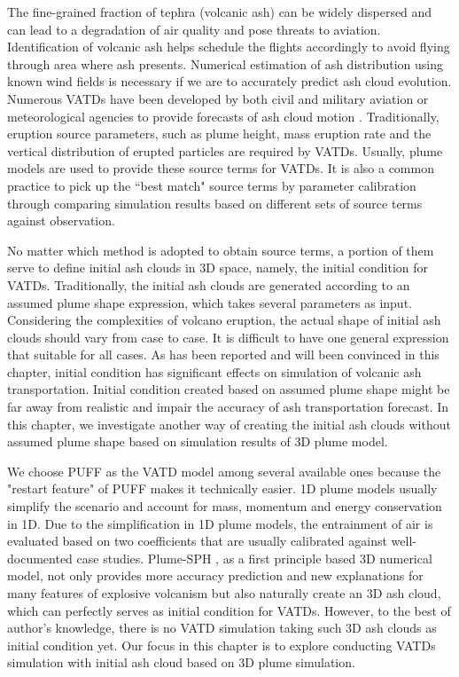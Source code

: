 The fine-grained fraction of tephra (volcanic ash) can be widely dispersed and can lead to a degradation of air quality and pose threats to aviation. Identification of volcanic ash helps schedule the flights accordingly to avoid flying through area where ash presents. Numerical estimation of ash distribution using known wind fields is necessary if we are to accurately predict ash cloud evolution. Numerous VATDs have been developed by both civil and military aviation or meteorological agencies to provide forecasts of ash cloud motion \citep{witham2007comparison}. Traditionally, eruption source parameters, such as plume height, mass eruption rate and the vertical distribution of erupted particles are required by VATDs. Usually, plume models are used to provide these source terms for VATDs. It is also a common practice to pick up the ``best match" source terms by parameter calibration through comparing simulation results based on different sets of source terms against observation. 

No matter which method is adopted to obtain source terms, a portion of them serve to define initial ash clouds in 3D space, namely, the initial condition for VATDs. Traditionally, the initial ash clouds are generated according to an assumed plume shape expression, which takes several parameters as input. Considering the complexities of volcano eruption, the actual shape of initial ash clouds should vary from case to case. It is difficult to have one general expression that suitable for all cases. As has been reported and will been convinced in this chapter, initial condition has significant effects on simulation of volcanic ash transportation. Initial condition created based on assumed plume shape might be far away from realistic and impair the accuracy of ash transportation forecast. In this chapter, we investigate another way of creating the initial ash clouds without assumed plume shape based on simulation results of 3D plume model.

We choose PUFF \citep{searcy1998puff} as the VATD model among several available ones \citep[e.g.][]{searcy1998puff,schwaiger2012ash3d} because the "restart feature" of PUFF makes it technically easier.
1D plume models \citep[e.g.][]{bursik2001effect} usually simplify the scenario and account for mass, momentum and energy conservation in 1D. Due to the simplification in 1D plume models, the entrainment of air is evaluated based on two coefficients that are usually calibrated against well-documented case studies.
Plume-SPH \citep{gmd-2017-119}, as a first principle based 3D numerical model, not only provides more accuracy prediction and new explanations for many features of explosive volcanism but also naturally create an 3D ash cloud, which can perfectly serves as initial condition for VATDs. However, to the best of author's knowledge, there is no VATD simulation taking such 3D ash clouds as initial condition yet. Our focus in this chapter is to explore conducting VATDs simulation with initial ash cloud based on 3D plume simulation. 

